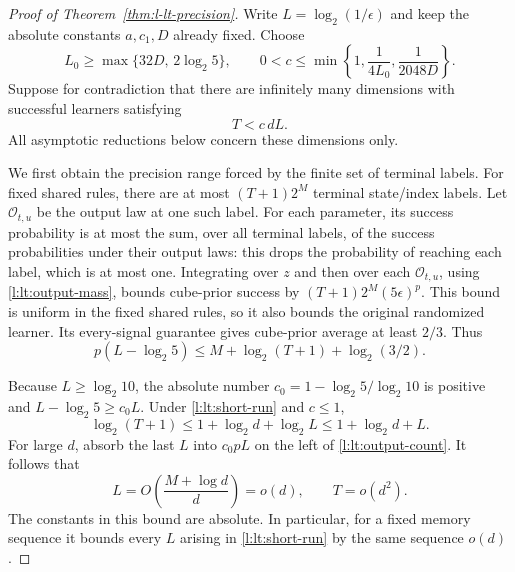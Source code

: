 \begin{proof}[Proof of Theorem~\ref{thm:l-lt-precision}]
Write $L=\log_2(1/\epsilon)$ and keep the absolute constants $a,c_1,D$
already fixed.  Choose
\begin{equation}\label{l:lt:endgame-constants}
 L_0\ge\max\{32D,\,2\log_2 5\},\qquad
 0<c\le\min\left\{1,\frac1{4L_0},\frac1{2048D}\right\}.
\end{equation}
Suppose for contradiction that there are infinitely many dimensions
with successful learners satisfying
\begin{equation}\label{l:lt:short-run}
 T<c\,dL.
\end{equation}
All asymptotic reductions below concern these dimensions only.

We first obtain the precision range forced by the finite set of
terminal labels.  For fixed shared rules, there are at most
$(T+1)2^M$ terminal state/index labels.  Let $\mathcal O_{t,u}$ be
the output law at one such label.  For each parameter, its success
probability is at most the sum, over all terminal labels, of the
success probabilities under their output laws: this drops the
probability of reaching each label, which is at most one.
Integrating over $z$ and then over each $\mathcal O_{t,u}$, using
\eqref{l:lt:output-mass}, bounds cube-prior success by
$(T+1)2^M(5\epsilon)^p$.  This bound is uniform in the fixed shared
rules, so it also bounds the original randomized learner.  Its
every-signal guarantee gives cube-prior average at least $2/3$.
Thus
\begin{equation}\label{l:lt:output-count}
 p(L-\log_2 5)
 \le M+\log_2(T+1)+\log_2(3/2).
\end{equation}

Because $L\ge\log_2 10$, the absolute number
$c_0=1-\log_2 5/\log_2 10$ is positive and
$L-\log_2 5\ge c_0L$.  Under \eqref{l:lt:short-run} and $c\le1$,
\[
 \log_2(T+1)\le1+\log_2 d+\log_2 L\le1+\log_2 d+L.
\]
For large $d$, absorb the last $L$ into $c_0pL$ on the left of
\eqref{l:lt:output-count}.  It follows that
\begin{equation}\label{l:lt:precision-reduction}
 L=O\!\left(\frac{M+\log d}{d}\right)=o(d),
 \qquad T=o(d^2).
\end{equation}
The constants in this bound are absolute.  In particular, for a
fixed memory sequence it bounds every $L$ arising in
\eqref{l:lt:short-run} by the same sequence $o(d)$.


\end{proof}
